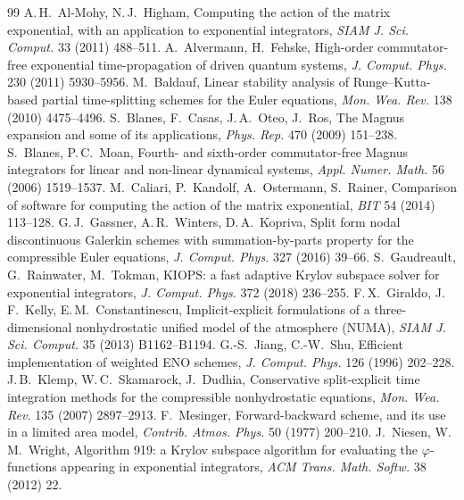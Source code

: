 \documentclass[11pt,a4paper]{article}
\theoremstyle{definition}
\theoremstyle{remark}
\begin{document}
\begin{thebibliography}{99}
\small
{} A.\,H.~Al-Mohy, N.\,J.~Higham, Computing the
 action of the matrix exponential, with an application to exponential
 integrators, \emph{SIAM J. Sci. Comput.} 33 (2011) 488--511.
 A.~Alvermann, H.~Fehske, High-order
 commutator-free exponential time-propagation of driven quantum systems,
 \emph{J. Comput. Phys.} 230 (2011) 5930--5956.
 M.~Baldauf, Linear stability analysis of
 Runge--Kutta-based partial time-splitting schemes for the Euler
 equations, \emph{Mon. Wea. Rev.} 138 (2010) 4475--4496.
 S.~Blanes, F.~Casas, J.\,A.~Oteo,
 J.~Ros, The Magnus expansion and some of its applications, \emph{Phys.
 Rep.} 470 (2009) 151--238.
 S.~Blanes, P.\,C.~Moan, Fourth- and sixth-order
 commutator-free Magnus integrators for linear and non-linear dynamical
 systems, \emph{Appl. Numer. Math.} 56 (2006) 1519--1537.
 M.~Caliari, P.~Kandolf,
 A.~Ostermann, S.~Rainer, Comparison of software for computing the action
 of the matrix exponential, \emph{BIT} 54 (2014) 113--128.
 G.\,J.~Gassner, A.\,R.~Winters,
 D.\,A.~Kopriva, Split form nodal discontinuous Galerkin schemes with
 summation-by-parts property for the compressible Euler equations,
 \emph{J. Comput. Phys.} 327 (2016) 39--66.
 S.~Gaudreault, G.~Rainwater,
 M.~Tokman, KIOPS: a fast adaptive Krylov subspace solver for exponential
 integrators, \emph{J. Comput. Phys.} 372 (2018) 236--255.
 F.\,X.~Giraldo, J.\,F.~Kelly,
 E.\,M.~Constantinescu, Implicit-explicit formulations of a
 three-dimensional nonhydrostatic unified model of the atmosphere (NUMA),
 \emph{SIAM J. Sci. Comput.} 35 (2013) B1162--B1194.
 G.-S.~Jiang, C.-W.~Shu, Efficient implementation
 of weighted ENO schemes, \emph{J. Comput. Phys.} 126 (1996) 202--228.
 J.\,B.~Klemp, W.\,C.~Skamarock,
 J.~Dudhia, Conservative split-explicit time integration methods for the
 compressible nonhydrostatic equations, \emph{Mon. Wea. Rev.} 135 (2007)
 2897--2913.
 F.~Mesinger, Forward-backward scheme, and its use
 in a limited area model, \emph{Contrib. Atmos. Phys.} 50 (1977) 200--210.
 J.~Niesen, W.\,M.~Wright, Algorithm 919: a
 Krylov subspace algorithm for evaluating the $\varphi$-functions appearing
 in exponential integrators, \emph{ACM Trans. Math. Softw.} 38 (2012) 22.

\end{thebibliography}
\end{document}
